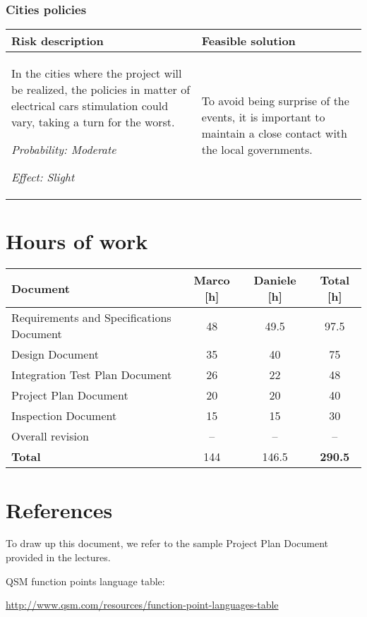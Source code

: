 \documentclass{scrreprt}
\begin{document}
\subsection{Cities policies}

\begin{center}
\begin{tabularx}{\columnwidth}{XX}
\toprule \textbf{Risk description} & \textbf{Feasible solution}\\
\midrule
In the cities where the project will be realized, the policies in matter of electrical cars stimulation could vary, taking a turn for the worst.

\emph{Probability: Moderate } 

\emph{Effect: Slight}& To avoid being surprise of the events, it is important to maintain a close contact with the local governments.\\
\bottomrule
\end{tabularx}
\end{center}



\begin{comment}
\begin{center}
\begin{tabularx}{\columnwidth}{XX}
\toprule \textbf{Risk description} & \textbf{Feasible solution}\\
\midrule
 & \\
\midrule
& \\
\bottomrule
\end{tabularx}
\end{center}
\end{comment}

\chapter{Hours of work}

\begin{center}
    \begin{tabularx}{\columnwidth}{Xccc}
        \toprule
	   \textbf{Document} & \textbf{Marco [h]}& \textbf{Daniele [h]} &\textbf{Total [h]}\\
	   \midrule
        Requirements and Specifications Document&48&49.5&97.5\\ 
        Design Document &35&40&75\\   
        Integration Test Plan Document &26&22&48\\    
        Project Plan Document &20&20&40\\   
        Inspection Document &15&15&30\\   
        Overall revision & -- & -- & --\\  
        
        \midrule
        
        \textbf{Total} & 144 & 146.5 & \textbf {290.5}\\
        
	\bottomrule
    \end{tabularx}
\end{center}
\chapter{References}
To draw up this document, we refer to the sample Project Plan Document provided in the lectures.

QSM function points language table:

\url{http://www.qsm.com/resources/function-point-languages-table}
\end{document}
